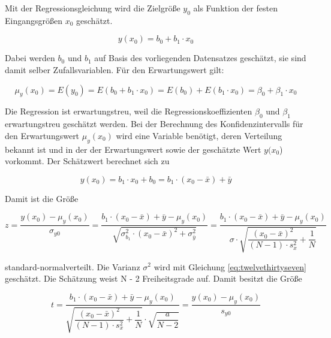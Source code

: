 \noindent Mit der Regressionsgleichung wird die Zielgr\"{o}{\ss}e $y_{0}$ als Funktion der festen Eingangsgr\"{o}{\ss}en $x_{0}$ gesch\"{a}tzt. 

\begin{equation}\label{eq:twelveeightyfour}
y(x_{0})=b_{0} +b_{1} \cdot x_{0}
\end{equation}

\noindent Dabei werden $b_{0}$ und $b_{1}$ auf Basis des vorliegenden Datensatzes gesch\"{a}tzt, sie sind damit selber Zufallsvariablen. F\"{u}r den Erwartungswert gilt:

\begin{equation}\label{eq:twelveeightyfive}
\mu _{y} (x_{0})=E(y_{0})=E(b_{0} +b_{1} \cdot x_{0})=E(b_{0})+E(b_{1} \cdot x_{0})=\beta _{0} +\beta _{1} \cdot x_{0}
\end{equation}

\noindent Die Regression ist erwartungstreu, weil die Regressionskoeffizienten $\beta_{0}$ und $\beta_{1}$ erwartungstreu gesch\"{a}tzt werden. Bei der Berechnung des Konfidenzintervalls f\"{u}r den Erwartungswert $\mu_{y}(x_{0})$ wird eine Variable ben\"{o}tigt, deren Verteilung bekannt ist und in der der Erwartungswert sowie der gesch\"{a}tzte Wert $y(x_{0}$) vorkommt. Der Sch\"{a}tzwert berechnet sich zu

\begin{equation}\label{eq:twelveeightysix}
y(x_{0})=b_{1} \cdot x_{0} +b_{0} =b_{1} \cdot (x_{0} -\bar{x})+\bar{y}
\end{equation}

\noindent Damit ist die Gr\"{o}{\ss}e 

\begin{equation}\label{eq:twelveeightyseven}
z=\dfrac{y\left(x_{0} \right)-\mu _{y} (x_{0})}{\sigma _{y0}} =\dfrac{b_{1} \cdot \left(x_{0} -\bar{x}\right)+\bar{y}-\mu _{y} \left(x_{0} \right)}{\sqrt{\sigma _{b_{1}}^{2} \cdot \left(x_{0} -\bar{x}\right)^{2} +\sigma _{\bar{y}}^{2}}} =\dfrac{b_{1} \cdot (x_{0} -\bar{x})+\bar{y}-\mu _{y} (x_{0})}{\sigma \cdot \sqrt{\dfrac{(x_{0} -\bar{x})^{2} }{(N-1)\cdot s_{x}^{2} } +\dfrac{1}{N}}}
\end{equation}

\noindent standard-normalverteilt. Die Varianz $\sigma^{2}$ wird mit Gleichung \eqref{eq:twelvethirtyseven} gesch\"{a}tzt. Die Sch\"{a}tzung weist N - 2 Freiheitsgrade auf. Damit besitzt die Gr\"{o}{\ss}e 

\begin{equation}\label{eq:twelveeightyeight}
t=\dfrac{b_{1} \cdot (x_{0} -\bar{x})+\bar{y}-\mu _{y} (x_{0})}{\sqrt{\dfrac{(x_{0} -\bar{x})^{2}}{(N-1)\cdot s_{x}^{2}} +\dfrac{1}{N}} \cdot \sqrt{\dfrac{a}{N-2}}} =\dfrac{y(x_{0})-\mu _{y} (x_{0})}{s_{y0}}
\end{equation}

